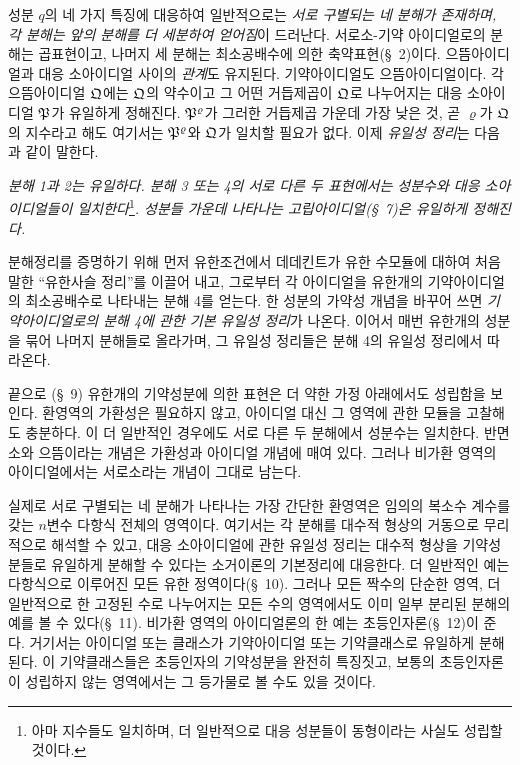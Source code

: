 성분 $q$의 네 가지 특징에 대응하여 일반적으로는 \emph{서로 구별되는 네 분해가 존재하며, 각 분해는 앞의 분해를 더 세분하여 얻어짐}이 드러난다. 서로소-기약 아이디얼로의 분해는 곱표현이고, 나머지 세 분해는 최소공배수에 의한 축약표현(\S~2)이다. 으뜸아이디얼과 대응 소아이디얼 사이의 \emph{관계}도 유지된다. 기약아이디얼도 으뜸아이디얼이다. 각 으뜸아이디얼 $\mathfrak{Q}$에는 $\mathfrak{Q}$의 약수이고 그 어떤 거듭제곱이 $\mathfrak{Q}$로 나누어지는 대응 소아이디얼 $\mathfrak{P}$가 유일하게 정해진다. $\mathfrak{P}^\varrho$가 그러한 거듭제곱 가운데 가장 낮은 것, 곧 $\varrho$가 $\mathfrak{Q}$의 지수라고 해도 여기서는 $\mathfrak{P}^\varrho$와 $\mathfrak{Q}$가 일치할 필요가 없다. 이제 \emph{유일성 정리}는 다음과 같이 말한다.

\emph{분해 1과 2는 유일하다. 분해 3 또는 4의 서로 다른 두 표현에서는 성분수와 대응 소아이디얼들이 일치한다}\footnote{아마 지수들도 일치하며, 더 일반적으로 대응 성분들이 동형이라는 사실도 성립할 것이다.}\emph{. 성분들 가운데 나타나는 고립아이디얼(\S~7)은 유일하게 정해진다.}

분해정리를 증명하기 위해 먼저 유한조건에서 데데킨트가 유한 수모듈에 대하여 처음 말한 ``유한사슬 정리''를 이끌어 내고, 그로부터 각 아이디얼을 유한개의 기약아이디얼의 최소공배수로 나타내는 분해 4를 얻는다. 한 성분의 가약성 개념을 바꾸어 쓰면 \emph{기약아이디얼로의 분해 4에 관한 기본 유일성 정리}가 나온다. 이어서 매번 유한개의 성분을 묶어 나머지 분해들로 올라가며, 그 유일성 정리들은 분해 4의 유일성 정리에서 따라온다.

끝으로 (\S~9) 유한개의 기약성분에 의한 표현은 더 약한 가정 아래에서도 성립함을 보인다. 환영역의 가환성은 필요하지 않고, 아이디얼 대신 그 영역에 관한 모듈을 고찰해도 충분하다. 이 더 일반적인 경우에도 서로 다른 두 분해에서 성분수는 일치한다. 반면 소와 으뜸이라는 개념은 가환성과 아이디얼 개념에 매여 있다. 그러나 비가환 영역의 아이디얼에서는 서로소라는 개념이 그대로 남는다.

실제로 서로 구별되는 네 분해가 나타나는 가장 간단한 환영역은 임의의 복소수 계수를 갖는 $n$변수 다항식 전체의 영역이다. 여기서는 각 분해를 대수적 형상의 거동으로 무리적으로 해석할 수 있고, 대응 소아이디얼에 관한 유일성 정리는 대수적 형상을 기약성분들로 유일하게 분해할 수 있다는 소거이론의 기본정리에 대응한다. 더 일반적인 예는 다항식으로 이루어진 모든 유한 정역이다(\S~10). 그러나 모든 짝수의 단순한 영역, 더 일반적으로 한 고정된 수로 나누어지는 모든 수의 영역에서도 이미 일부 분리된 분해의 예를 볼 수 있다(\S~11). 비가환 영역의 아이디얼론의 한 예는 초등인자론(\S~12)이 준다. 거기서는 아이디얼 또는 클래스가 기약아이디얼 또는 기약클래스로 유일하게 분해된다. 이 기약클래스들은 초등인자의 기약성분을 완전히 특징짓고, 보통의 초등인자론이 성립하지 않는 영역에서는 그 등가물로 볼 수도 있을 것이다.


